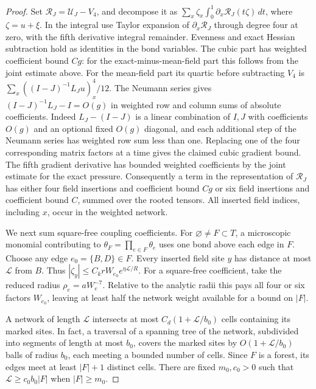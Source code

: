 \documentclass[11pt]{article}
\theoremstyle{definition}
\begin{document}
\begin{proof}
Set \(\mathcal R_J=\mathcal U_J-V_4\), and decompose it as
\(\sum_x \zeta_x\int_0^1\partial_x\mathcal R_J(t\zeta)\,dt\),
where \(\zeta=u+\xi\). In the integral use Taylor expansion of
\(\partial_x\mathcal R_J\) through degree four at zero, with
the fifth derivative integral remainder. Evenness and exact
Hessian subtraction hold as identities in the bond variables.
The cubic part has weighted coefficient bound \(Cg\): for
the exact-minus-mean-field part this follows from the joint
estimate above. For the mean-field part its quartic before
subtracting \(V_4\) is
\(\sum_x ((I-J)^{-1} L_J u)_x^4/12\).
The Neumann series gives
\((I-J)^{-1}L_J-I=O(g)\) in weighted row and column sums of
absolute coefficients. Indeed \(L_J-(I-J)\) is a linear
combination of \(I,J\) with coefficients \(O(g)\) and an optional
fixed \(O(g)\) diagonal, and
each additional step of the Neumann series has weighted row
sum less than one. Replacing one of the four corresponding
matrix factors at a time gives the claimed cubic gradient
bound. The fifth gradient derivative has bounded weighted
coefficients by the joint estimate for the exact pressure.
Consequently a term in the representation of \(\mathcal R_J\)
has either four field insertions and coefficient bound \(Cg\)
or six field insertions and coefficient bound \(C\), summed
over the rooted tensors. All inserted field indices, including
\(x\), occur in the weighted network.

We next sum square-free coupling coefficients. For
\(\varnothing\ne F\subset T\), a microscopic monomial contributing
to \(\theta_F=\prod_{e\in F}\theta_e\) uses one bond above each
edge in \(F\). Choose any edge \(e_0=\{B,D\}\in F\). Every inserted
field site \(y\) has distance at most \(\mathcal L\) from \(B\).
Thus \(|\zeta_y|\le C_k r W_{e_0}e^{\eta\mathcal L/R}\).
For a square-free coefficient, take the reduced radius
\(\rho_e=aW_e^{-7}\). Relative to the analytic radii this
pays all four or six factors \(W_{e_0}\), leaving at least half
the network weight available for a bound on \(|F|\).

A network of length \(\mathcal L\) intersects at most
\(C_d(1+\mathcal L/b_0)\) cells containing its marked sites.
In fact, a traversal of a spanning tree of the network,
subdivided into segments of length at most \(b_0\), covers the
marked sites by \(O(1+\mathcal L/b_0)\) balls of radius \(b_0\),
each meeting a bounded number of cells. Since \(F\) is a forest,
its edges meet at least \(|F|+1\) distinct cells. There are
fixed \(m_0,c_0>0\) such that \(\mathcal L\ge c_0 b_0|F|\)
when \(|F|\ge m_0\).


\end{proof}
\end{document}
